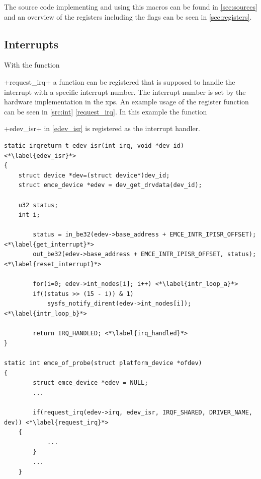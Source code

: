 \documentclass[12pt,a4paper,parskip=full,abstract=true,BCOR=12mm]{scrreprt}
\newcommand{\hack}{}
\newcommand*{\SavedLstInline}{}
\DeclareRobustCommand*{\lstinline}{%
  \ifmmode
    \let\SavedBGroup\bgroup
    \def\bgroup{%
      \let\bgroup\SavedBGroup
      \hbox\bgroup
    }%
  \fi
  \SavedLstInline
}
\begin{document}
The source code implementing and using this macros can be found in
\cref{sec:sources} and an overview of the registers including the flags can be
seen in \cref{sec:registers}.


\subsection{Interrupts}
\label{sec:interrupts}

With the function \lstinline+request_irq+ a function can be registered that
is supposed to handle the interrupt with a specific interrupt number\cite{ldd}. The
interrupt number is set by the hardware implementation in the \gls{xps}.
An example usage of the register function can be seen in \cref{src:int}
\cref{request_irq}. In this example the function \lstinline+edev_isr+
in \cref{edev_isr} is registered as the interrupt handler.

\begin{lstlisting}[float=htb,caption={Driver interrupt routine},label=src:int,basicstyle=\hack\scriptsize]
static irqreturn_t edev_isr(int irq, void *dev_id) <*\label{edev_isr}*>
{
	struct device *dev=(struct device*)dev_id;
	struct emce_device *edev = dev_get_drvdata(dev_id);

	u32 status;
	int i;

        status = in_be32(edev->base_address + EMCE_INTR_IPISR_OFFSET); <*\label{get_interrupt}*>
        out_be32(edev->base_address + EMCE_INTR_IPISR_OFFSET, status); <*\label{reset_interrupt}*>

        for(i=0; edev->int_nodes[i]; i++) <*\label{intr_loop_a}*>
		if((status >> (15 - i)) & 1)
			sysfs_notify_dirent(edev->int_nodes[i]); <*\label{intr_loop_b}*>

        return IRQ_HANDLED; <*\label{irq_handled}*>
}

static int emce_of_probe(struct platform_device *ofdev)
{
        struct emce_device *edev = NULL;
        ...

        if(request_irq(edev->irq, edev_isr, IRQF_SHARED, DRIVER_NAME, dev)) <*\label{request_irq}*>
	{
            ...
        }
        ...
    }
\end{lstlisting}
\end{document}
